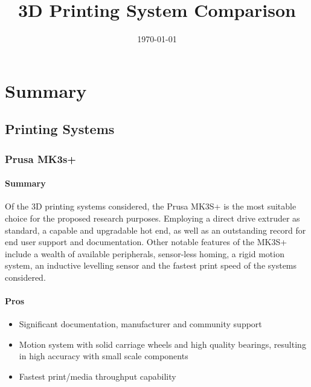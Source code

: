\documentclass[11pt]{article}
\date{\today}
\title{3D Printing System Comparison}
\begin{document}
\setcounter{secnumdepth}{4}

\pretitle{\begin{flushleft}\fontsize{18bp}{18bp}\selectfont}
  \posttitle{\par\end{flushleft}}
\predate{\begin{flushleft}}
\postdate{\end{flushleft}}

\maketitle

\section{Summary}
\label{sec:org4aab5aa}

\subsection{Printing Systems}
\label{sec:orgbcc6ccc}

\subsubsection{Prusa MK3s+}
\label{sec:orgd310f51}

\paragraph{Summary\\}
\label{sec:orgb6fa7cd}
Of the 3D printing systems considered, the Prusa MK3S+ is the most suitable choice for the proposed research purposes. Employing a direct drive extruder as standard, a capable and upgradable hot end, as well as an outstanding record for end user support and documentation. Other notable features of the MK3S+ include a wealth of available peripherals, sensor-less homing, a rigid motion system, an inductive levelling sensor and the fastest print speed of the systems considered.

\paragraph{Pros}
\label{sec:orga6b981f}
\begin{itemize}
\item Significant documentation, manufacturer and community support
\item Motion system with solid carriage wheels and high quality bearings, resulting in high accuracy with small scale components
\item Fastest print/media throughput capability
\end{itemize}
\end{document}
